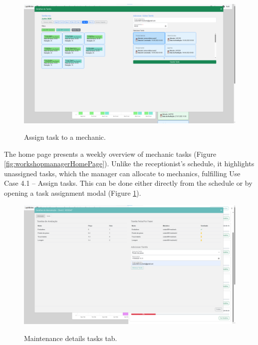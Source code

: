 \begin{figure}[h]
  \caption{Assign task to a mechanic.}
  \centering
  \includegraphics[width=\textwidth]{figs/Implementation/workshopmanager/addTask}
  \label{fig:workshopmanagerAssignTask}
\end{figure}



The home page presents a weekly overview of mechanic tasks (Figure \ref{fig:workshopmanagerHomePage}). Unlike the receptionist's schedule, it highlights unassigned tasks, which the manager can allocate to mechanics, fulfilling Use Case 4.1 – Assign tasks. This can be done either directly from the schedule or by opening a task assignment modal (Figure \ref{fig:workshopmanagerAssignTask}).





\begin{figure}[h]
  \caption{Maintenance details tasks tab.}
  \centering
  \includegraphics[width=\textwidth]{figs/Implementation/workshopmanager/maintenanceDetailsTask}
  \label{fig:workshopmanagerMaintenanceDetailsTask}
\end{figure}

